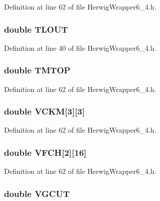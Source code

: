 Definition at line 62 of file Herwig\-Wrapper6\_\-4.h.
\subsubsection{\setlength{\rightskip}{0pt plus 5cm}double {\bf TLOUT}}\label{HerwigWrapper6__4_8h_b6a5230500bc176f66fb0d3b972fd969}




Definition at line 40 of file Herwig\-Wrapper6\_\-4.h.
\subsubsection{\setlength{\rightskip}{0pt plus 5cm}double {\bf TMTOP}}\label{HerwigWrapper6__4_8h_eb80e94fd0b73011a5ec7d1a5281576d}




Definition at line 62 of file Herwig\-Wrapper6\_\-4.h.
\subsubsection{\setlength{\rightskip}{0pt plus 5cm}double {\bf VCKM}[3][3]}\label{HerwigWrapper6__4_8h_6dc09c3811f184307e2a83779705a714}




Definition at line 62 of file Herwig\-Wrapper6\_\-4.h.
\subsubsection{\setlength{\rightskip}{0pt plus 5cm}double {\bf VFCH}[2][16]}\label{HerwigWrapper6__4_8h_748f23581c8e894ea3991be1b66be772}




Definition at line 62 of file Herwig\-Wrapper6\_\-4.h.
\subsubsection{\setlength{\rightskip}{0pt plus 5cm}double {\bf VGCUT}}\label{HerwigWrapper6__4_8h_2520c9c725dc73c7b5e72b24b6825949}




